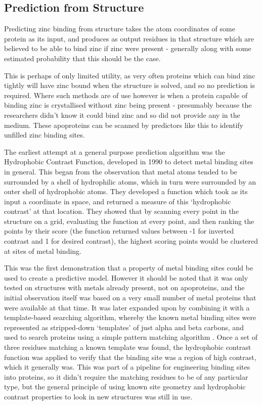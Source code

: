 \subsection{Prediction from Structure}

Predicting zinc binding from structure takes the atom coordinates of some protein as its input, and produces as output residues in that structure which are believed to be able to bind zinc if zinc were present - generally along with some estimated probability that this should be the case.

This is perhaps of only limited utility, as very often proteins which can bind zinc tightly will have zinc bound when the structure is solved, and so no prediction is required. Where such methods are of use however is when a protein capable of binding zinc is crystallised without zinc being present - presumably because the researchers didn't know it could bind zinc and so did not provide any in the medium. These apoproteins can be scanned by predictors like this to identify unfilled zinc binding sites. 


The earliest attempt at a general purpose prediction algorithm was the Hydrophobic Contrast Function, developed in 1990 \cite{yamashita1990metal} to detect metal binding sites in general. This began from the observation that metal atoms tended to be surrounded by a shell of hydrophilic atoms, which in turn were surrounded by an outer shell of hydrophobic atoms. They developed a function which took as its input a coordinate in space, and returned a measure of this `hydrophobic contrast' at that location. They showed that by scanning every point in the structure on a grid, evaluating the function at every point, and then ranking the points by their score (the function returned values between -1 for inverted contrast and 1 for desired contrast), the highest scoring points would be clustered at sites of metal binding.

This was the first demonstration that a property of metal binding sites could be used to create a predictive model. However it should be noted that it was only tested on structures with metals already present, not on apoproteins, and the initial observation itself was based on a very small number of metal proteins that were available at that time. It was later expanded upon by combining it with a template-based searching algorithm, whereby the known metal binding sites were represented as stripped-down `templates' of just alpha and beta carbons, and used to search proteins using a simple pattern matching algorithm \cite{gregory1993prediction}. Once a set of three residues matching a known template was found, the hydrophobic contrast function was applied to verify that the binding site was a region of high contrast, which it generally was. This was part of a pipeline for engineering binding sites into proteins, so it didn't require the matching residues to be of any particular type, but the general principle of using known site geometry and hydrophobic contrast properties to look in new structures was still in use.

